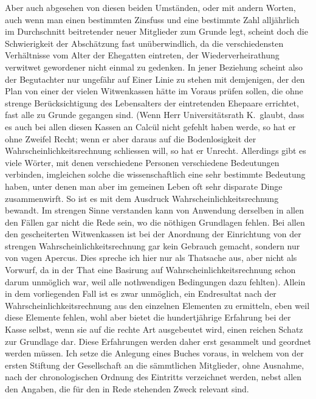 \documentclass[12pt,a4paper]{article}
\begin{document}
Aber auch abgesehen von diesen beiden Umst\"anden, oder mit andern Worten, auch wenn man einen bestimmten Zinsfuss und eine bestimmte Zahl allj\"ahrlich im Durchschnitt beitretender neuer Mitglieder zum Grunde legt, scheint doch die Schwierigkeit der Absch\"atzung fast un\"uberwindlich, da die verschiedensten Verh\"altnisse vom Alter der Ehegatten eintreten, der Wiederverheirathung verwitwet gewordener nicht einmal zu gedenken. In jener Beziehung scheint also der Begutachter nur ungef\"ahr auf Einer Linie zu stehen mit demjenigen, der den Plan von einer der vielen Witwenkassen h\"atte im Voraus pr\"ufen sollen, die ohne strenge Ber\"ucksichtigung des Lebensalters der eintretenden Ehepaare errichtet, fast alle zu Grunde gegangen sind. (Wenn Herr Universit\"atsrath K.\ glaubt, dass es auch bei allen diesen Kassen an Calc\"ul nicht gefehlt haben werde, so hat er ohne Zweifel Recht; wenn er aber daraus auf die Bodenlosigkeit der Wahrscheinlichkeitsrechnung schliessen will, so hat er Unrecht. Allerdings gibt es viele W\"orter, mit denen verschiedene Personen verschiedene Bedeutungen verbinden, imgleichen solche die wissenschaftlich eine sehr bestimmte Bedeutung haben, unter denen man aber im gemeinen Leben oft sehr disparate Dinge zusammenwirft. So ist es mit dem Ausdruck Wahrscheinlichkeitsrechnung bewandt. Im strengen Sinne verstanden kann von Anwendung derselben in allen den F\"allen gar nicht die Rede sein, wo die n\"othigen Grundlagen fehlen. Bei allen den gescheiterten Witwenkassen ist bei der Anordnung der Einrichtung von der strengen Wahrscheinlichkeitsrechnung gar kein Gebrauch gemacht, sondern nur von vagen Apercus. Dies spreche ich hier nur als Thatsache aus, aber nicht als Vorwurf, da in der That eine Basirung auf Wahrscheinlichkeitsrechnung schon darum unm\"oglich war, weil alle nothwendigen Bedingungen dazu fehlten). Allein in dem vorliegenden Fall ist es zwar unm\"oglich, ein Endresultat nach der Wahrscheinlichkeitsrechnung aus den einzelnen Elementen zu ermitteln, eben weil diese Elemente fehlen, wohl aber bietet die hundertj\"ahrige Erfahrung bei der Kasse selbst, wenn sie auf die rechte Art ausgebeutet wird, einen reichen Schatz zur Grundlage dar. Diese Erfahrungen werden daher erst gesammelt und geordnet werden m\"ussen. Ich setze die Anlegung eines Buches voraus, in welchem von der ersten Stiftung der Gesellschaft an die s\"ammtlichen Mitglieder, ohne Ausnahme, nach der chronologischen Ordnung des Eintritts verzeichnet werden, nebst allen den Angaben, die f\"ur den in Rede stehenden Zweck relevant sind.
\end{document}
